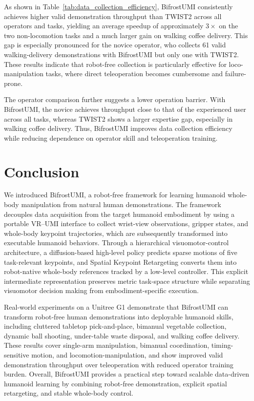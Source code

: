 \documentclass[letterpaper, 10 pt, conference]{ieeeconf}  %
\begin{document}
As shown in Table~\ref{tab:data_collection_efficiency}, BifrostUMI consistently achieves higher valid demonstration throughput than TWIST2 across all operators and tasks, yielding an average speedup of approximately $3\times$ on the two non-locomotion tasks and a much larger gain on walking coffee delivery. This gap is especially pronounced for the novice operator, who collects 61 valid walking-delivery demonstrations with BifrostUMI but only one with TWIST2. These results indicate that robot-free collection is particularly effective for loco-manipulation tasks, where direct teleoperation becomes cumbersome and failure-prone.

The operator comparison further suggests a lower operation barrier. With BifrostUMI, the novice achieves throughput close to that of the experienced user across all tasks, whereas TWIST2 shows a larger expertise gap, especially in walking coffee delivery. Thus, BifrostUMI improves data collection efficiency while reducing dependence on operator skill and teleoperation training.




\section{Conclusion}

We introduced BifrostUMI, a robot-free framework for learning humanoid whole-body manipulation from natural human demonstrations. The framework decouples data acquisition from the target humanoid embodiment by using a portable VR--UMI interface to collect wrist-view observations, gripper states, and whole-body keypoint trajectories, which are subsequently transformed into executable humanoid behaviors. Through a hierarchical visuomotor-control architecture, a diffusion-based high-level policy predicts sparse motions of five task-relevant keypoints, and Spatial Keypoint Retargeting converts them into robot-native whole-body references tracked by a low-level controller. This explicit intermediate representation preserves metric task-space structure while separating visuomotor decision making from embodiment-specific execution.

Real-world experiments on a Unitree G1 demonstrate that BifrostUMI can transform robot-free human demonstrations into deployable humanoid skills, including cluttered tabletop pick-and-place, bimanual vegetable collection, dynamic ball shooting, under-table waste disposal, and walking coffee delivery. These results cover single-arm manipulation, bimanual coordination, timing-sensitive motion, and locomotion-manipulation, and show improved valid demonstration throughput over teleoperation with reduced operator training burden. Overall, BifrostUMI provides a practical step toward scalable data-driven humanoid learning by combining robot-free demonstration, explicit spatial retargeting, and stable whole-body control.





\end{document}
